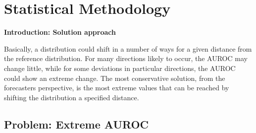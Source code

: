 


\section{Statistical Methodology} \label{sec:theory}




\textbf{Introduction: Solution approach}

Basically, a distribution could shift in a number of ways for a given distance from the reference distribution.
For many directions likely to occur, the AUROC may change little, while for some deviations in particular directions, the AUROC could show an extreme change.
The most conservative solution, from the forecasters perspective, is the most extreme values that can be reached by shifting the distribution a specified distance.



\subsection{Problem: Extreme AUROC}

